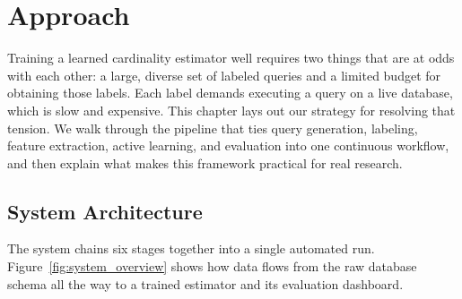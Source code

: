 \chapter{Approach}
\label{chap:approach}
\pagestyle{plain}

Training a learned cardinality estimator well requires two things that are at odds with each other: a large, diverse set of labeled queries and a limited budget for obtaining those labels. Each label demands executing a query on a live database, which is slow and expensive. This chapter lays out our strategy for resolving that tension. We walk through the pipeline that ties query generation, labeling, feature extraction, active learning, and evaluation into one continuous workflow, and then explain what makes this framework practical for real research.


\section{System Architecture}

The system chains six stages together into a single automated run. Figure~\ref{fig:system_overview} shows how data flows from the raw database schema all the way to a trained estimator and its evaluation dashboard.

